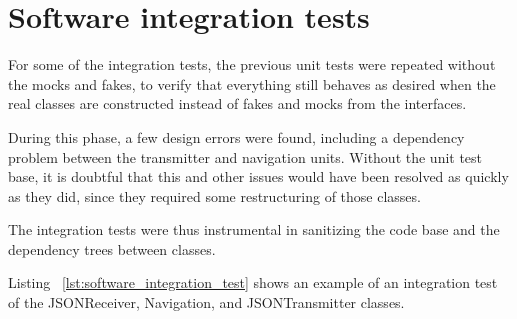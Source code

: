 \newpage
\section{Software integration tests}
\label{sec:software_int}

For some of the integration tests, the previous unit tests were repeated without the mocks and fakes, to verify that everything still behaves as desired when the real classes are constructed instead of fakes and mocks from the interfaces.

During this phase, a few design errors were found, including a dependency problem between the transmitter and navigation units. Without the unit test base, it is doubtful that this and other issues would have been resolved as quickly as they did, since they required some restructuring of those classes. 

The integration tests were thus instrumental in sanitizing the code base and the dependency trees between classes.

Listing ~\ref{lst:software_integration_test} shows an example of an integration test of the JSONReceiver, Navigation, and JSONTransmitter classes.

